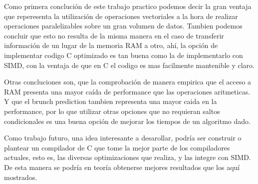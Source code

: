 \documentclass[a4paper]{article}
\begin{document}
Como primera conclución de este trabajo practico podemos decir la gran ventaja que reperesenta la utilización de operaciones vectoriales a la hora de realizar operaciones paralelizables sobre un gran volumen de datos. Tambien podemos concluir que esto no resulta de la misma manera en el caso de transferir información de un lugar de la memoria RAM a otro, ahí, la opción de implementar codigo C optimizado es tan buena como la de implementarlo con SIMD, con la ventaja de que en C el codigo es mas facilmente mantenible y claro.

Otras concluciones son, que la comprobación de manera empirica que el acceso a RAM presenta una mayor caída de performance que las operaciones aritmeticas. Y que el brunch prediction tambien representa una mayor caida en la performance, por lo que utilizar otras opciones que no requieran saltos condicionales es una buena opción de mejorar los tiempos de un algoritmo dado.

Como trabajo futuro, una idea interesante a desarollar, podría ser construir o plantear un compilador de C que tome la mejor parte de los compiladores actuales, esto es, las diversas optimizaciones que realiza, y las integre con SIMD. De esta manera se podría en teoría obtenerse mejores resultados que los aquí mostrados.
\end{document}
